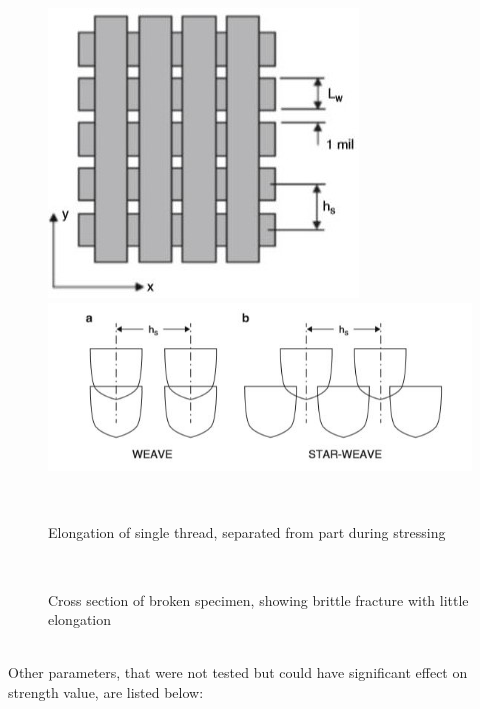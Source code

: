 \documentclass[a4paper, twoside, 11pt]{report}
\begin{document}
\begin{figure}[!t]
\begin{minipage}[b]{0.45\textwidth}
    \includegraphics[width=\textwidth]{weave1}
  \end{minipage}
  \hfill
  \begin{minipage}[b]{0.45\textwidth}
    \includegraphics[width=\textwidth]{weave2}
  \end{minipage}
  \\[1pt]
  \begin{minipage}[t]{0.45\textwidth}
    \caption{Elongation of single thread, separated from part during stressing}
  \end{minipage}
  \hfill
  \begin{minipage}[t]{0.45\textwidth}
    \caption{Cross section of broken specimen, showing brittle fracture with little elongation}
  \end{minipage}
  \\[5pt]
\end{figure}
%
\\Other parameters, that were not tested but could have significant effect on strength value, are listed below:
\end{document}
